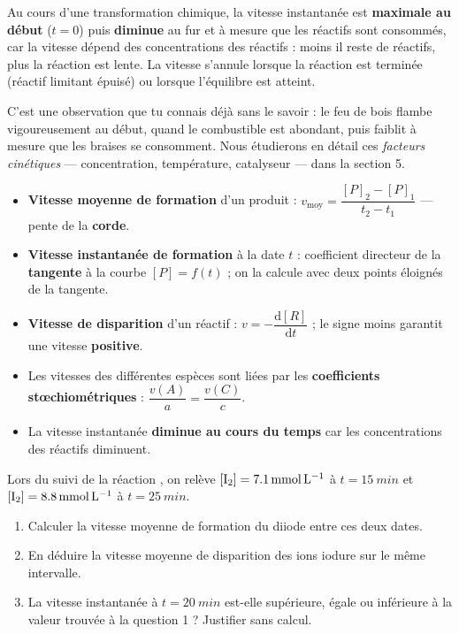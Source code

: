 \documentclass[11pt]{article}
\begin{document}
\begin{propriete}
Au cours d'une transformation chimique, la vitesse instantanée est \textbf{maximale au début} ($t = 0$) puis \textbf{diminue} au fur et à mesure que les réactifs sont consommés, car la vitesse dépend des concentrations des réactifs : moins il reste de réactifs, plus la réaction est lente. La vitesse s'annule lorsque la réaction est terminée (réactif limitant épuisé) ou lorsque l'équilibre est atteint.
\end{propriete}

C'est une observation que tu connais déjà sans le savoir : le feu de bois flambe vigoureusement au début, quand le combustible est abondant, puis faiblit à mesure que les braises se consomment. Nous étudierons en détail ces \emph{facteurs cinétiques} — concentration, température, catalyseur — dans la section 5.

\begin{aretenir}
\begin{itemize}
\item \textbf{Vitesse moyenne de formation} d'un produit : $v_{\text{moy}} = \dfrac{[P]_2 - [P]_1}{t_2 - t_1}$ — pente de la \textbf{corde}.
\item \textbf{Vitesse instantanée de formation} à la date $t$ : coefficient directeur de la \textbf{tangente} à la courbe $[P] = f(t)$ ; on la calcule avec deux points éloignés de la tangente.
\item \textbf{Vitesse de disparition} d'un réactif : $v = -\dfrac{\mathrm{d}[R]}{\mathrm{d}t}$ ; le signe moins garantit une vitesse \textbf{positive}.
\item Les vitesses des différentes espèces sont liées par les \textbf{coefficients stœchiométriques} : $\dfrac{v(A)}{a} = \dfrac{v(C)}{c}$.
\item La vitesse instantanée \textbf{diminue au cours du temps} car les concentrations des réactifs diminuent.
\end{itemize}
\end{aretenir}

\begin{exercice}
Lors du suivi de la réaction , on relève $[\ce{I2}] = \SI{7,1}{mmol.L^{-1}}$ à $t = \SI{15}{min}$ et $[\ce{I2}] = \SI{8,8}{mmol.L^{-1}}$ à $t = \SI{25}{min}$.
\begin{enumerate}
\item Calculer la vitesse moyenne de formation du diiode entre ces deux dates.
\item En déduire la vitesse moyenne de disparition des ions iodure sur le même intervalle.
\item La vitesse instantanée à $t = \SI{20}{min}$ est-elle supérieure, égale ou inférieure à la valeur trouvée à la question 1 ? Justifier sans calcul.
\end{enumerate}
\end{exercice}
\end{document}
